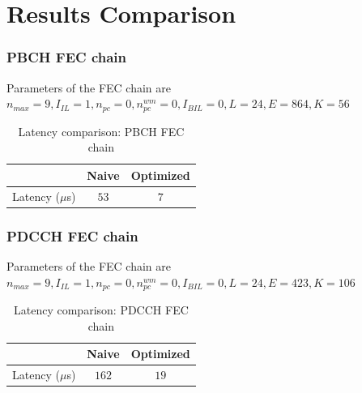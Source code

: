 \section{Results Comparison}

\subsubsection{PBCH FEC chain}
Parameters of the FEC chain are \newline
$n_{max} = 9, I_{IL} = 1, n_{pc} = 0, n_{pc}^{wm} = 0, I_{BIL} = 0, L = 24, E = 864, K = 56$
\begin{table}[!h]
	\begin{center}
		\caption{Latency comparison: PBCH FEC chain}
		\label{tab:pbchFecChain}
		\begin{tabular}{c|c|c} %
			\textbf{ } & Naive & Optimized \\
			\hline
			Latency ($\mu$s) & $53$ & $7$\\
		\end{tabular}
	\end{center}
\end{table}

\subsubsection{PDCCH FEC chain} 
Parameters of the FEC chain are \newline
$n_{max} = 9, I_{IL} = 1, n_{pc} = 0, n_{pc}^{wm} = 0, I_{BIL} = 0, L = 24, E = 423, K = 106$
\begin{table}[!h]
	\begin{center}
		\caption{Latency comparison: PDCCH FEC chain}
		\label{tab:pdcchFecChain}
		\begin{tabular}{c|c|c} %
			\textbf{ } & Naive & Optimized \\
			\hline
			Latency ($\mu$s) & $162$ & $19$\\
		\end{tabular}
	\end{center}
\end{table}


